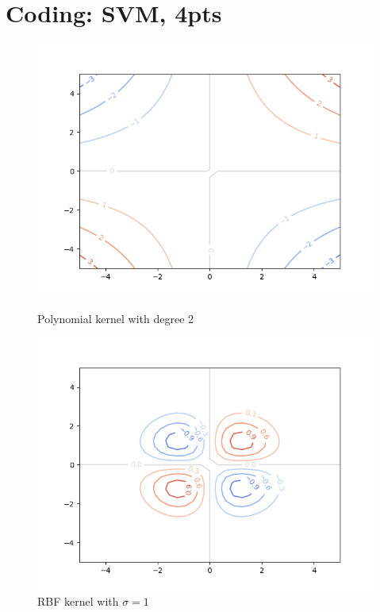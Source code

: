 \documentclass[12pt]{article}
\begin{document}
\section{Coding: SVM, 4pts}
\begin{figure}[!htb]
    \begin{minipage}{0.48\textwidth}
        \centering
        \includegraphics[width=\linewidth]{Figure_1.png}
        \caption{Polynomial kernel with degree 2}
    \end{minipage}\hfill
    \begin{minipage}{0.48\textwidth}
        \centering
        \includegraphics[width=\linewidth]{Figure_2.png}
        \caption{RBF kernel with $\sigma=1$}

\end{minipage}
\end{figure}
\end{document}
